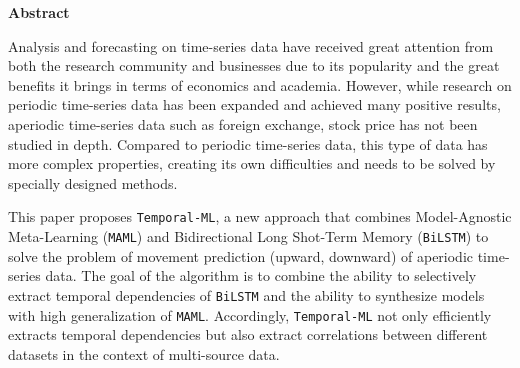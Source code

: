 
\begin{center}
    {\LARGE\bf Abstract}
\end{center}
\vspace{20pt}


Analysis and forecasting on time-series data have received great attention from both the research community and businesses due to its popularity and the great benefits it brings in terms of economics and academia. However, while research on periodic time-series data has been expanded and achieved many positive results, aperiodic time-series data such as foreign exchange, stock price has not been studied in depth. Compared to periodic time-series data, this type of data has more complex properties, creating its own difficulties and needs to be solved by specially designed methods.


This paper proposes \verb|Temporal-ML|, a new approach that combines Model-Agnostic Meta-Learning (\verb|MAML|) and Bidirectional Long Shot-Term Memory (\verb|BiLSTM|) to solve the problem of movement prediction (upward, downward) of aperiodic time-series data. The goal of the algorithm is to combine the ability to selectively extract temporal dependencies of \verb|BiLSTM| and the ability to synthesize models with high generalization of \verb|MAML|. Accordingly, \verb|Temporal-ML| not only efficiently extracts temporal dependencies but also extract correlations between different datasets in the context of multi-source data.

